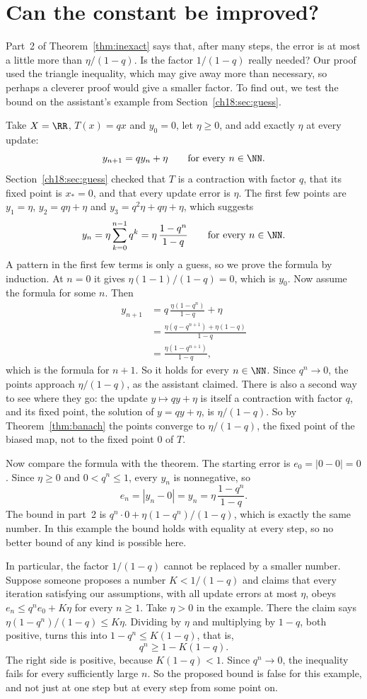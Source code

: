 \section{Can the constant be improved?}\label{ch18:sec:sharp}
Part~2 of Theorem~\ref{thm:inexact} says that, after many steps, the error is at most a little more than $\eta/(1-q)$. Is the factor $1/(1-q)$ really needed? Our proof used the triangle inequality, which may give away more than necessary, so perhaps a cleverer proof would give a smaller factor. To find out, we test the bound on the assistant's example from Section~\ref{ch18:sec:guess}.

Take $X=\RR$, $T(x)=qx$ and $y_0=0$, let $\eta\ge0$, and add exactly $\eta$ at every update:
\[
 y_{n+1}=qy_n+\eta\qquad\text{for every }n\in\NN.
\]
Section~\ref{ch18:sec:guess} checked that $T$ is a contraction with factor $q$, that its fixed point is $x_*=0$, and that every update error is $\eta$. The first few points are $y_1=\eta$, $y_2=q\eta+\eta$ and $y_3=q^2\eta+q\eta+\eta$, which suggests
\[
 y_n=\eta\sum_{k=0}^{n-1}q^k
     =\eta\,\frac{1-q^n}{1-q}\qquad\text{for every }n\in\NN.
\]
A pattern in the first few terms is only a guess, so we prove the formula by induction. At $n=0$ it gives $\eta(1-1)/(1-q)=0$, which is $y_0$. Now assume the formula for some $n$. Then
\begin{align*}
 y_{n+1}
 &=q\,\frac{\eta(1-q^n)}{1-q}+\eta\\
 &=\frac{\eta(q-q^{n+1})+\eta(1-q)}{1-q}\\
 &=\frac{\eta(1-q^{n+1})}{1-q},
\end{align*}
which is the formula for $n+1$. So it holds for every $n\in\NN$. Since $q^n\to0$, the points approach $\eta/(1-q)$, as the assistant claimed. There is also a second way to see where they go: the update $y\mapsto qy+\eta$ is itself a contraction with factor $q$, and its fixed point, the solution of $y=qy+\eta$, is $\eta/(1-q)$. So by Theorem~\ref{thm:banach} the points converge to $\eta/(1-q)$, the fixed point of the biased map, not to the fixed point $0$ of $T$.

Now compare the formula with the theorem. The starting error is $e_0=|0-0|=0$. Since $\eta\ge0$ and $0<q^n\le1$, every $y_n$ is nonnegative, so
\[
 e_n=|y_n-0|=y_n=\eta\,\frac{1-q^n}{1-q}.
\]
The bound in part~2 is $q^n\cdot0+\eta(1-q^n)/(1-q)$, which is exactly the same number. In this example the bound holds with equality at every step, so no better bound of any kind is possible here.

In particular, the factor $1/(1-q)$ cannot be replaced by a smaller number. Suppose someone proposes a number $K<1/(1-q)$ and claims that every iteration satisfying our assumptions, with all update errors at most $\eta$, obeys $e_n\le q^ne_0+K\eta$ for every $n\ge1$. Take $\eta>0$ in the example. There the claim says $\eta(1-q^n)/(1-q)\le K\eta$. Dividing by $\eta$ and multiplying by $1-q$, both positive, turns this into $1-q^n\le K(1-q)$, that is,
\[
 q^n\ge1-K(1-q).
\]
The right side is positive, because $K(1-q)<1$. Since $q^n\to0$, the inequality fails for every sufficiently large $n$. So the proposed bound is false for this example, and not just at one step but at every step from some point on.


